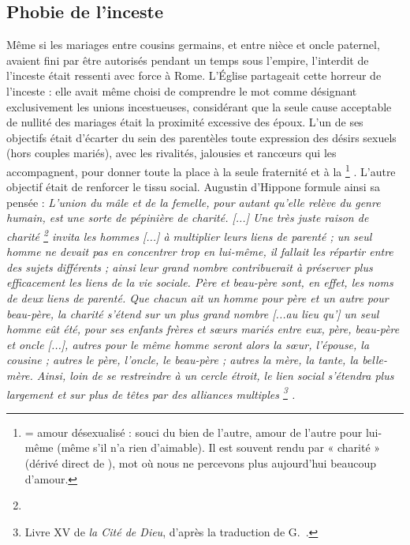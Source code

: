 \subsection{Phobie de l'inceste}

 Même si les mariages entre cousins germains, et entre nièce et oncle paternel, avaient fini par être autorisés pendant un temps sous l'empire, l'interdit de l'inceste était ressenti avec force à Rome. L'Église partageait cette horreur de l'inceste : elle avait même choisi de comprendre le mot  comme désignant exclusivement les unions incestueuses, considérant que la seule cause acceptable de nullité des mariages était la proximité excessive des époux. L'un de ses objectifs était d'écarter du sein des parentèles toute expression des désirs sexuels (hors couples mariés), avec les rivalités, jalousies et rancœurs qui les accompagnent, pour donner toute la place à la seule fraternité et à la %
\footnote{ = amour désexualisé : souci du bien de l'autre, amour de l'autre pour lui-même (même s'il n'a rien d'aimable). Il est souvent rendu par « charité » (dérivé direct de ), mot où nous ne percevons plus aujourd'hui beaucoup d'amour.}%
. L'autre objectif était de renforcer le tissu social. Augustin d'Hippone formule ainsi sa pensée : \emph{L'union du mâle et de la femelle, pour autant qu'elle relève du genre humain, est une sorte de pépinière de charité. \emph{[...]} Une très juste raison de charité%
\footnote{}
invita les hommes \emph{[...]} à multiplier leurs liens de parenté ; un seul homme ne devait pas en concentrer trop en lui-même, il fallait les répartir entre des sujets différents ; ainsi leur grand nombre contribuerait à préserver plus efficacement les liens de la vie sociale. Père et beau-père sont, en effet, les noms de deux liens de parenté. Que chacun ait un homme pour père et un autre pour beau-père, la charité s'étend sur un plus grand nombre \emph{[...au lieu qu']} un seul homme eût été, pour ses enfants frères et sœurs mariés entre eux, père, beau-père et oncle \emph{[...]}, autres pour le même homme seront alors la sœur, l'épouse, la cousine ; autres le père, l'oncle, le beau-père ; autres la mère, la tante, la belle-mère. Ainsi, loin de se restreindre à un cercle étroit, le lien social s'étendra plus largement et sur plus de têtes par des alliances multiples%
\footnote{Livre XV de \emph{la Cité de Dieu}, d'après la traduction de G.~.}%
.}

